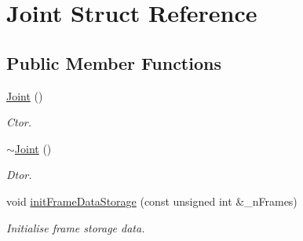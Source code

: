 \hypertarget{struct_joint}{}\section{Joint Struct Reference}
\label{struct_joint}
\subsection*{Public Member Functions}
\begin{DoxyCompactItemize}
\item 
\hyperlink{struct_joint_a79a7a4715b2166714e039d7c7c5ea3b4}{Joint} ()\hypertarget{struct_joint_a79a7a4715b2166714e039d7c7c5ea3b4}{}\label{struct_joint_a79a7a4715b2166714e039d7c7c5ea3b4}

\begin{DoxyCompactList}\small\item\em Ctor. \end{DoxyCompactList}\item 
\hyperlink{struct_joint_a42aca0bd1832136984923713127c28f1}{$\sim$\+Joint} ()\hypertarget{struct_joint_a42aca0bd1832136984923713127c28f1}{}\label{struct_joint_a42aca0bd1832136984923713127c28f1}

\begin{DoxyCompactList}\small\item\em Dtor. \end{DoxyCompactList}\item 
void \hyperlink{struct_joint_abe1503153ea6ccc3f657e7ddca30e48b}{init\+Frame\+Data\+Storage} (const unsigned int \&\+\_\+n\+Frames)
\begin{DoxyCompactList}\small\item\em Initialise frame storage data. \end{DoxyCompactList}\end{DoxyCompactItemize}
